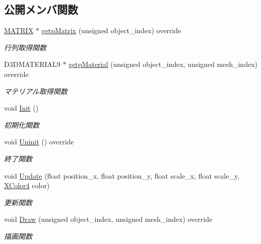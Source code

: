 \subsection*{公開メンバ関数}
\begin{DoxyCompactItemize}
\item 
\mbox{\hyperlink{_matrix_8h_a032295cd9fb1b711757c90667278e744}{M\+A\+T\+R\+IX}} $\ast$ \mbox{\hyperlink{class_render_texture_polygon_a76ab48dff0a23ee4db47da598f4d6a70}{getp\+Matrix}} (unsigned object\+\_\+index) override
\begin{DoxyCompactList}\small\item\em 行列取得関数 \end{DoxyCompactList}\item 
D3\+D\+M\+A\+T\+E\+R\+I\+A\+L9 $\ast$ \mbox{\hyperlink{class_render_texture_polygon_a86dac06a0a8c8cc64ade472011745fa3}{getp\+Material}} (unsigned object\+\_\+index, unsigned mesh\+\_\+index) override
\begin{DoxyCompactList}\small\item\em マテリアル取得関数 \end{DoxyCompactList}\item 
void \mbox{\hyperlink{class_render_texture_polygon_a623a232ed09b2bfca8c3557075044aac}{Init}} ()
\begin{DoxyCompactList}\small\item\em 初期化関数 \end{DoxyCompactList}\item 
void \mbox{\hyperlink{class_render_texture_polygon_a3ff2fc37bb953074a5ab8a0dde7aaa1c}{Uninit}} () override
\begin{DoxyCompactList}\small\item\em 終了関数 \end{DoxyCompactList}\item 
void \mbox{\hyperlink{class_render_texture_polygon_aacbc16dd7ed1117533728d68dcfeb154}{Update}} (float position\+\_\+x, float position\+\_\+y, float scale\+\_\+x, float scale\+\_\+y, \mbox{\hyperlink{_vector3_d_8h_a680c30c4a07d86fe763c7e01169cd6cc}{X\+Color4}} color)
\begin{DoxyCompactList}\small\item\em 更新関数 \end{DoxyCompactList}\item 
void \mbox{\hyperlink{class_render_texture_polygon_a95e688cae107312649c1fb7965e2ba6b}{Draw}} (unsigned object\+\_\+index, unsigned mesh\+\_\+index) override
\begin{DoxyCompactList}\small\item\em 描画関数 \end{DoxyCompactList}\end{DoxyCompactItemize}
